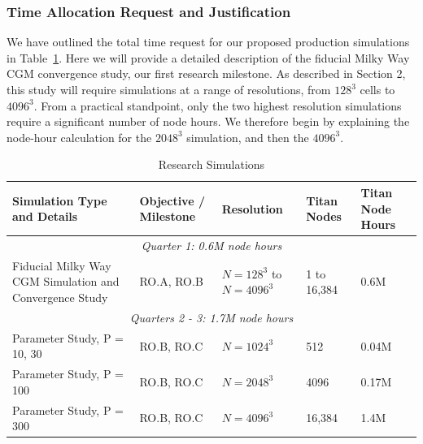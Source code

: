 \documentclass[11pt,letterpaper,english]{article}
\begin{document}
\subsubsection{Time Allocation Request and Justification}


We have outlined the total time request for our proposed production simulations in Table~\ref{table:RS}. Here we will provide a detailed description of the fiducial Milky Way CGM convergence study, our first research milestone. As described in Section 2, this study will require simulations at a range of resolutions, from $128^3$ cells to $4096^3$. From a practical standpoint, only the two highest resolution simulations require a significant number of node hours. We therefore begin by explaining the node-hour calculation for the $2048^3$ simulation, and then the $4096^3$.



\begin{table}[h]
\caption{Research Simulations}
\label{table:RS}
\begin{tabular}{|p{2in}|p{1in}|p{0.7in}|p{0.5in}|p{0.7in}|} 
\hline
{\bf Simulation Type and Details} & {\bf Objective / Milestone} & {\bf Resolution} & {\bf Titan Nodes} & {\bf Titan Node Hours} \\ \hline
\multicolumn{5}{|c|}{\it Quarter 1: 0.6M node hours} \\ \hline
Fiducial Milky Way CGM Simulation and Convergence Study & RO.A, RO.B & $N = 128^3$ to $N=4096^3$ & 1 to 16,384 & 0.6M\\ \hline
\multicolumn{5}{|c|}{\it Quarters 2 - 3: 1.7M node hours} \\ \hline
Parameter Study, P = 10, 30 & RO.B, RO.C & $N = 1024^3$ & 512 & 0.04M\\ \hline
Parameter Study, P = 100 & RO.B, RO.C & $N=2048^3$ & 4096 & 0.17M\\ \hline
Parameter Study, P = 300 & RO.B, RO.C & $N=4096^3$ & 16,384 & 1.4M\\ \hline
\end{tabular}
\end{table}
\end{document}
